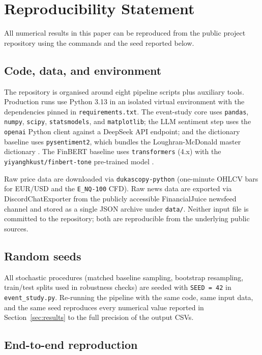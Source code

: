 \section{Reproducibility Statement}
\label{app:reproducibility}

All numerical results in this paper can be reproduced from the
public project repository using the commands and the seed reported
below.

\subsection*{Code, data, and environment}

The repository is organised around eight pipeline scripts plus
auxiliary tools. Production runs use Python 3.13 in an isolated
virtual environment with the dependencies pinned in
\texttt{requirements.txt}. The event-study core uses
\texttt{pandas}, \texttt{numpy}, \texttt{scipy}, \texttt{statsmodels},
and \texttt{matplotlib}; the LLM sentiment step uses the
\texttt{openai} Python client against a DeepSeek API endpoint; and
the dictionary baseline uses \texttt{pysentiment2}, which bundles
the Loughran-McDonald master dictionary
\citep{loughran2011liability}. The FinBERT baseline uses
\texttt{transformers} (4.x) with the
\texttt{yiyanghkust/finbert-tone} pre-trained model
\citep{yang2020finbert}.

Raw price data are downloaded via \texttt{dukascopy-python}
(one-minute OHLCV bars for EUR/USD and the \texttt{E\_NQ-100}
CFD). Raw news data are exported via DiscordChatExporter from the
publicly accessible FinancialJuice newsfeed channel and stored as
a single JSON archive under \texttt{data/}. Neither input file is
committed to the repository; both are reproducible from the
underlying public sources.

\subsection*{Random seeds}

All stochastic procedures (matched baseline sampling, bootstrap
resampling, train/test splits used in robustness checks) are
seeded with \texttt{SEED = 42} in \texttt{event\_study.py}.
Re-running the pipeline with the same code, same input data, and
the same seed reproduces every numerical value reported in
Section~\ref{sec:results} to the full precision of the output
CSVs.

\subsection*{End-to-end reproduction}

